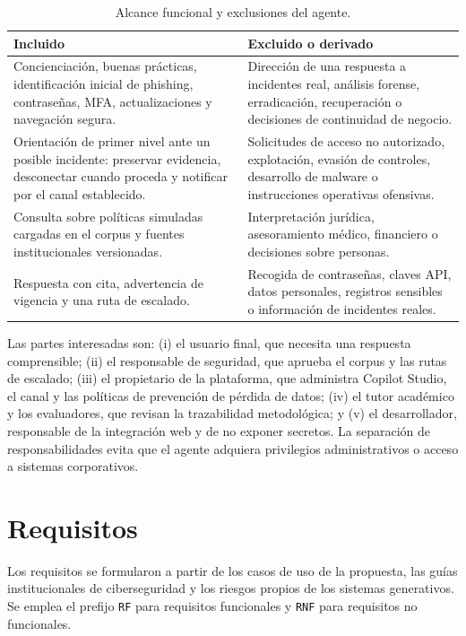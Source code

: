\begin{table}[H]
\centering
\small
\caption{Alcance funcional y exclusiones del agente.}
\label{tab:alcance}
\begin{tabularx}{\textwidth}{p{}X}
\toprule
\textbf{Incluido} & \textbf{Excluido o derivado}\\
\midrule
Concienciaci\'on, buenas pr\'acticas, identificaci\'on inicial de phishing, contrase\~nas, MFA, actualizaciones y navegaci\'on segura. & Direcci\'on de una respuesta a incidentes real, an\'alisis forense, erradicaci\'on, recuperaci\'on o decisiones de continuidad de negocio.\\
Orientaci\'on de primer nivel ante un posible incidente: preservar evidencia, desconectar cuando proceda y notificar por el canal establecido. & Solicitudes de acceso no autorizado, explotaci\'on, evasi\'on de controles, desarrollo de malware o instrucciones operativas ofensivas.\\
Consulta sobre pol\'iticas simuladas cargadas en el corpus y fuentes institucionales versionadas. & Interpretaci\'on jur\'idica, asesoramiento m\'edico, financiero o decisiones sobre personas.\\
Respuesta con cita, advertencia de vigencia y una ruta de escalado. & Recogida de contrase\~nas, claves API, datos personales, registros sensibles o informaci\'on de incidentes reales.\\
\bottomrule
\end{tabularx}
\end{table}

Las partes interesadas son: (i) el usuario final, que necesita una respuesta comprensible; (ii) el responsable de seguridad, que aprueba el corpus y las rutas de escalado; (iii) el propietario de la plataforma, que administra Copilot Studio, el canal y las pol\'iticas de prevenci\'on de p\'erdida de datos; (iv) el tutor acad\'emico y los evaluadores, que revisan la trazabilidad metodol\'ogica; y (v) el desarrollador, responsable de la integraci\'on web y de no exponer secretos. La separaci\'on de responsabilidades evita que el agente adquiera privilegios administrativos o acceso a sistemas corporativos.

\section{Requisitos}

Los requisitos se formularon a partir de los casos de uso de la propuesta, las gu\'ias institucionales de ciberseguridad y los riesgos propios de los sistemas generativos. Se emplea el prefijo \texttt{RF} para requisitos funcionales y \texttt{RNF} para requisitos no funcionales.

